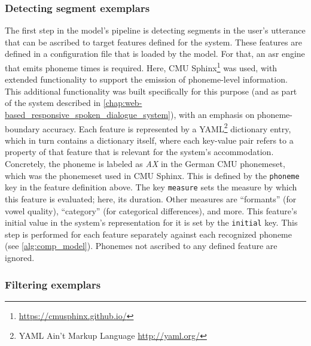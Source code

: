 \subsubsection{Detecting segment exemplars}
\label{subsubsec:detecting segment exemplars}

The first step in the model's pipeline is detecting segments in the user's utterance that can be ascribed to target features defined for the system.
These features are defined in a configuration file that is loaded by the model.
For that, an \ac{asr} engine that emits phoneme times is required.
Here, CMU Sphinx\footnote{\url{https://cmusphinx.github.io/}} was used, with extended functionality to support the emission of phoneme-level information.
This additional functionality was built specifically for this purpose (and as part of the system described in \cref{chap:web-based_responsive_spoken_dialogue_system}), with an emphasis on phoneme-boundary accuracy.
Each feature is represented by a YAML\footnote{YAML Ain't Markup Language \url{http://yaml.org/}} dictionary entry, which in turn contains a dictionary itself, where each key-value pair refers to a property of that feature that is relevant for the system's accommodation.
Concretely, the phoneme \textipa{[@]} is labeled as \emph{AX} in the German CMU phonemeset, which was the phonemeset used in CMU Sphinx.
This is defined by the \texttt{phoneme} key in the feature definition above.
The key \texttt{measure} sets the measure by which this feature is evaluated; here, its duration.
Other measures are \enquote{formants} (for vowel quality), \enquote{category} (for categorical differences), and more.
This feature's initial value in the system's representation for it is set by the \texttt{initial} key.
This step is performed for each feature separately against each recognized phoneme (see \cref{alg:comp_model}).
Phonemes not ascribed to any defined feature are ignored.

\subsubsection{Filtering exemplars}
\label{subsubsec:filtering_exemplars}

